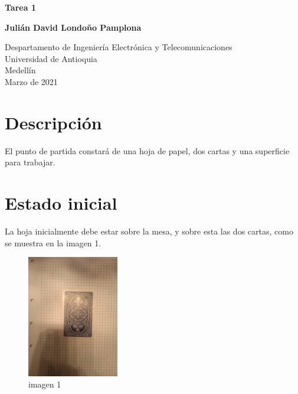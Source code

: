 \documentclass{article}
\begin{document}
\begin{titlepage}
    \begin{center}
        \vspace*{1cm}
            
        \Huge
        \textbf{Tarea 1}
            
        \vspace{0.5cm}
        \LARGE
        
            
        \vspace{1.5cm}
            
        \textbf{Julián David Londoño Pamplona}
            
        \vfill
            
        \vspace{0.8cm}
            
        \Large
        Despartamento de Ingeniería Electrónica y Telecomunicaciones\\
        Universidad de Antioquia\\
        Medellín\\
        Marzo de 2021
            
    \end{center}
\end{titlepage}

\tableofcontents
\newpage
\section{Descripción}\label{intro}
El punto de partida constará de una hoja de papel, dos cartas y una superficie para trabajar.

\section{Estado inicial} \label{contenido}
La hoja inicialmente debe estar sobre la mesa, y sobre esta las dos cartas, como se muestra en la imagen 1.
\begin{figure}[h]
\includegraphics[width=4cm]{imagen 1.png}
\centering
\caption{imagen 1}
\label{fig:cpplogo}
\end{figure}
\end{document}
